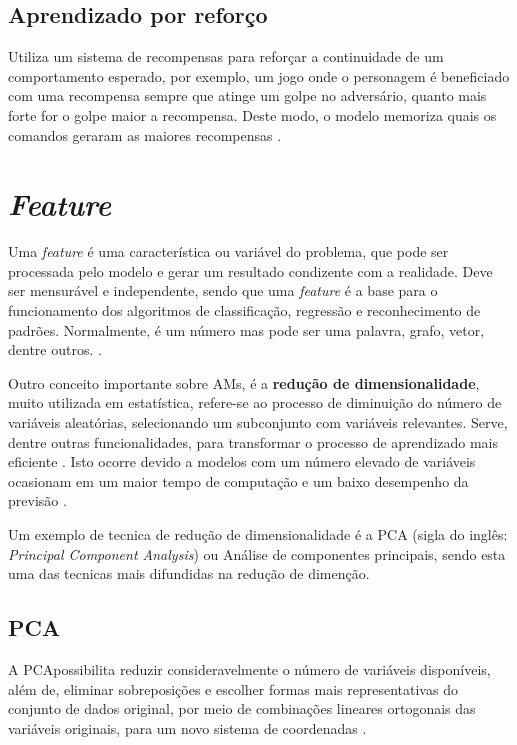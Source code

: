 \subsection{Aprendizado por reforço}
Utiliza um sistema de recompensas para reforçar a continuidade de um comportamento esperado, por exemplo, um jogo onde o personagem é beneficiado com uma recompensa sempre que atinge um golpe no adversário, quanto mais forte for o golpe maior a recompensa. Deste modo, o modelo memoriza quais os comandos geraram as maiores recompensas \cite{kirk2014thoughtful}.

\section{\textit{Feature}} 
Uma \textit{feature} é uma característica ou variável do problema, que pode ser processada pelo modelo e gerar um resultado condizente com a realidade. Deve ser mensurável e independente, sendo que uma \textit{feature} é a base para o funcionamento dos algoritmos de classificação, regressão e reconhecimento de padrões. Normalmente, é um número mas pode ser uma palavra, grafo, vetor, dentre outros. \cite{chandrashekar2014survey}.

Outro conceito importante sobre AMs, é a \textbf{redução de dimensionalidade}, muito utilizada em estatística, refere-se ao processo de diminuição do número de variáveis aleatórias, selecionando um subconjunto com variáveis relevantes. Serve, dentre outras funcionalidades, para transformar o processo de aprendizado mais eficiente \cite{borges2006reduccao}. Isto ocorre devido a modelos com um número elevado de variáveis ocasionam em um maior tempo de computação e um baixo desempenho da previsão \cite{chandrashekar2014survey}.

Um exemplo de  tecnica de redução de dimensionalidade é a PCA (sigla do inglês: \textit{Principal Component Analysis}) ou Análise de componentes principais, sendo esta uma das tecnicas mais difundidas na redução de dimenção.

\subsection{PCA}
A PCApossibilita reduzir consideravelmente o número de variáveis disponíveis, além de, eliminar sobreposições e escolher formas mais representativas do conjunto de dados original, por meio de combinações lineares ortogonais das variáveis originais, para um novo sistema de coordenadas \cite{jolliffe2011principal}.


